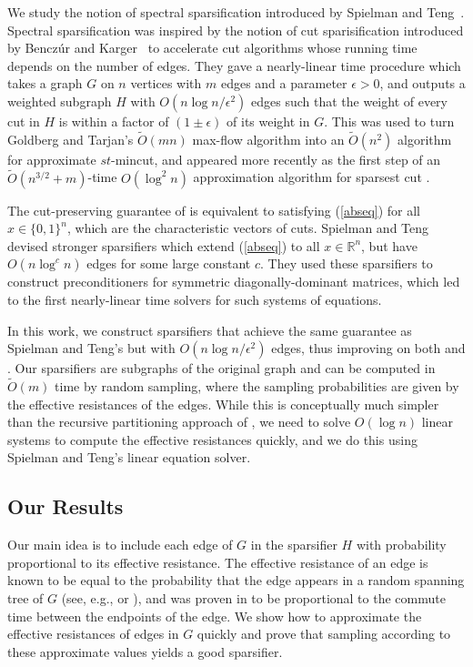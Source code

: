 \documentclass[11pt]{article}
\newcommand{\Otilde}{\widetilde{O}}
\newcommand{\R}{\mathbb{R}}
\begin{document}
We study the notion of spectral sparsification introduced
  by Spielman and Teng~\cite{st08}.
Spectral sparsification 
  was
  inspired by the notion of cut sparisification introduced by
  Bencz\'ur and Karger~\cite{bk}
to
accelerate cut algorithms whose running time depends on the
number of edges. They gave a nearly-linear time procedure which takes a
graph $G$ on $n$ vertices with $m$ edges and a parameter $\epsilon>0$, and outputs a weighted subgraph $H$
with $O(n\log n/\epsilon^2)$ edges such that the weight of every cut in
$H$ is within a factor of $(1\pm \epsilon)$ of its weight in $G$. This was used 
to turn Goldberg and Tarjan's $\Otilde(mn)$ max-flow algorithm \cite{goldtar} into an $\Otilde(n^2)$ algorithm
for approximate $st$-mincut, and appeared more recently as the first step of
an $\Otilde(n^{3/2}+m)$-time $O(\log^2n)$ approximation algorithm for sparsest cut \cite{krv}.

The cut-preserving guarantee of \cite{bk} is equivalent to satisfying
(\ref{abseq}) for all $x\in\{0,1\}^n$, 
which are the characteristic vectors of cuts. 
Spielman and Teng \cite{st04,st08} devised stronger sparsifiers which extend (\ref{abseq}) to all $x\in\R^n$, 
but have $O(n\log^c n)$ edges for some large constant $c$. They used these sparsifiers to construct preconditioners for
symmetric diagonally-dominant matrices, which led to the first nearly-linear
time solvers for such systems of equations.

In this work, we construct sparsifiers that achieve the same guarantee as Spielman and Teng's
but with $O(n\log n/\epsilon^2)$ edges, thus improving on 
both \cite{bk} and \cite{st04}. Our sparsifiers are subgraphs of the original graph and can be computed
in $\Otilde(m)$ time by random sampling, where the sampling probabilities are given by
the effective resistances of the edges.
While this is conceptually much simpler than the recursive partitioning approach of
\cite{st04}, we need to solve $O (\log n)$ linear systems to compute the effective resistances quickly, and we do this 
  using Spielman and Teng's linear equation solver.

\subsection{Our Results}

Our main idea is to include each edge of $G$ in the sparsifier $H$ with probability
proportional to its effective resistance. The effective resistance of an edge is known
to be equal to the probability that the edge
appears in a random spanning tree of $G$ (see, e.g., \cite{doylesnell} or
\cite{bollobas}), and was proven in \cite{chandra} to be
proportional to the commute time between the endpoints of the edge.
We show how to approximate the effective resistances of edges in $G$
quickly and prove that sampling according to these approximate values yields a good sparsifier.
\end{document}
